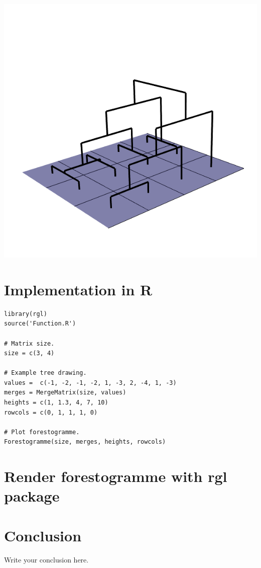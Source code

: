 \documentclass{article}
\begin{document}
\centering \includegraphics[scale=0.3]{step5}

\raggedright


\section{Implementation in R}

\begin{lstlisting}[]
library(rgl)
source('Function.R')

# Matrix size.
size = c(3, 4)

# Example tree drawing.
values =  c(-1, -2, -1, -2, 1, -3, 2, -4, 1, -3)
merges = MergeMatrix(size, values)
heights = c(1, 1.3, 4, 7, 10)
rowcols = c(0, 1, 1, 1, 0)

# Plot forestogramme.
Forestogramme(size, merges, heights, rowcols)
\end{lstlisting}
\section{Render forestogramme with rgl package}
\section{Conclusion}
Write your conclusion here.
\end{document}
